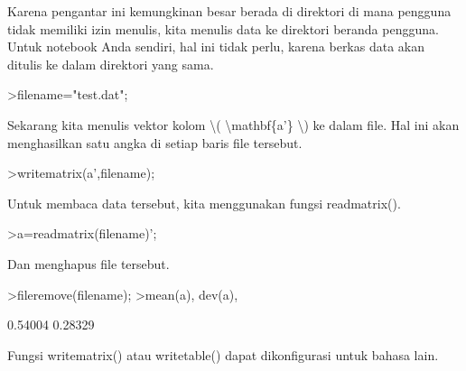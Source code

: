 \documentclass[a4paper,10pt]{article}
\begin{document}
\begin{eulernotebook}
\begin{eulercomment}
\begin{eulercomment}
\begin{eulercomment}
\begin{eulercomment}
\begin{eulercomment}
\begin{eulercomment}
\begin{eulercomment}
Karena pengantar ini kemungkinan besar berada di direktori di mana
pengguna tidak memiliki izin menulis, kita menulis data ke direktori
beranda pengguna. Untuk notebook Anda sendiri, hal ini tidak perlu,
karena berkas data akan ditulis ke dalam direktori yang sama.
\end{eulercomment}
\begin{eulerprompt}
>filename="test.dat";
\end{eulerprompt}
\begin{eulercomment}
Sekarang kita menulis vektor kolom \textbackslash{}( \textbackslash{}mathbf\{a'\} \textbackslash{}) ke dalam file.
Hal ini akan menghasilkan satu angka di setiap baris file tersebut.
\end{eulercomment}
\begin{eulerprompt}
>writematrix(a',filename);
\end{eulerprompt}
\begin{eulercomment}
Untuk membaca data tersebut, kita menggunakan fungsi readmatrix().
\end{eulercomment}
\begin{eulerprompt}
>a=readmatrix(filename)';
\end{eulerprompt}
\begin{eulercomment}
Dan menghapus file tersebut.
\end{eulercomment}
\begin{eulerprompt}
>fileremove(filename);
>mean(a), dev(a),
\end{eulerprompt}
\begin{euleroutput}
  0.54004
  0.28329
\end{euleroutput}
\begin{eulercomment}
Fungsi writematrix() atau writetable() dapat dikonfigurasi untuk
bahasa lain.


\end{eulercomment}
\end{eulercomment}
\end{eulercomment}
\end{eulercomment}
\end{eulercomment}
\end{eulercomment}
\end{eulercomment}
\end{eulernotebook}
\end{document}
